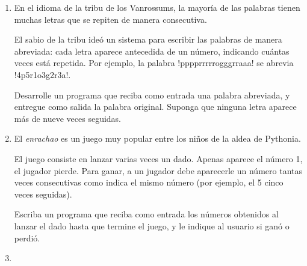 \documentclass[11pt,spanish]{article}
\newcommand{\pond}[1]{[{\small\textbf{#1\%}}]}
\begin{document}
\begin{enumerate}[font=\Large\bfseries]
    \newpage
    \item
      \pond{25}
      En el idioma de la tribu de los Vanrossums,
      la mayoría de las palabras tienen muchas letras
      que se repiten de manera consecutiva.

      El sabio de la tribu ideó un sistema
      para escribir las palabras de manera abreviada:
      cada letra aparece antecedida de un número,
      indicando cuántas veces está repetida.
      Por ejemplo, la palabra \li!pppprrrrrogggrraaa!
      se abrevia \li!4p5r1o3g2r3a!.

      Desarrolle un programa
      que reciba como entrada una palabra abreviada,
      y entregue como salida la palabra original.
      Suponga que ninguna letra
      aparece más de nueve veces seguidas.

    \newpage
    \item
      \pond{25}
      El \emph{enrachao} es un juego muy popular
      entre los niños de la aldea de Pythonia.

      El juego consiste en lanzar varias veces un dado.
      Apenas aparece el número 1, el jugador pierde.
      Para ganar, a un jugador debe aparecerle un número
      tantas veces consecutivas como indica el mismo número
      (por ejemplo, el 5 cinco veces seguidas).

      Escriba un programa que reciba como entrada
      los números obtenidos al lanzar el dado
      hasta que termine el juego,
      y le indique al usuario si ganó o perdió.

      \begin{minipage}[t]{.26\textwidth}
        
      \end{minipage}
      \hspace{1em}
      \begin{minipage}[t]{.26\textwidth}
        
      \end{minipage}

    \newpage
    \item
      \pond{25}

  \end{enumerate}
\end{document}

